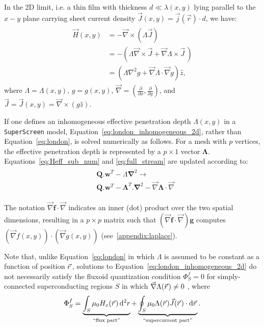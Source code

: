 \documentclass[final,3p,times,twocolumn]{elsarticle}
\newcommand{\pvec}[1]{\vec{#1}\mkern2mu\vphantom{#1}}
\newcommand{\inline}[1]{\texttt{#1}\xspace}
\newcommand{\SuperScreen}{\inline{SuperScreen}}
\newcounter{bla}
\begin{document}
In the 2D limit, i.e. a thin film with thickness $d\ll\lambda(x, y)$ lying parallel to the $x-y$ plane carrying sheet current density $\vec{J}(x, y)=\vec{j}(\vec{r})\cdot d$, we have:
\begin{align}
\begin{split}
    \label{eq:london_inhomogeneous_2d}
    \vec{H}(x, y)&=-\vec{\nabla}\times(\Lambda\vec{J})\\
    &=-\left(\Lambda\vec{\nabla}\times\vec{J}+\vec{\nabla}\Lambda\times\vec{J}\,\right)\\
    &=\left(\Lambda\nabla^2g+\vec{\nabla}\Lambda\cdot\vec{\nabla}g\right)\hat{z},
\end{split}
\end{align}
where $\Lambda=\Lambda(x, y)$, $g=g(x, y)$, $\vec{\nabla}=\left(\frac{\partial}{\partial x},\frac{\partial}{\partial y}\right)$, and $\vec{J}=\vec{J}(x, y)=\vec{\nabla}\times(g\hat{z})$.

If one defines an inhomogeneous effective penetration depth $\Lambda(x, y)$ in a \SuperScreen model, Equation~\ref{eq:london_inhomogeneous_2d}, rather than Equation~\ref{eq:london}, is solved numerically as follows. For a mesh with $p$ vertices, the effective penetration depth is represented by a $p\times 1$ vector $\mathbf{\Lambda}$. Equations~\ref{eq:Heff_sub_num} and \ref{eq:full_stream} are updated according to:
\begin{align}
\begin{split}
    \label{eq:Heff_inhomogeneous}
    &\mathbf{Q}.\mathbf{w}^T-\Lambda\mathbf{\nabla}^2\to\\
    &\mathbf{Q}.\mathbf{w}^T-\mathbf{\Lambda}^T.\mathbf{\nabla}^2-\vec{\nabla}\mathbf{\Lambda}\cdot\vec{\nabla}
\end{split}
\end{align}

The notation $\vec{\nabla}\mathbf{f}\cdot\vec{\nabla}$ indicates an inner (dot) product over the two spatial dimensions, resulting in a $p\times p$ matrix such that $(\vec{\nabla}\mathbf{f}\cdot\vec{\nabla})\mathbf{g}$ computes $(\vec{\nabla}f(x, y))\cdot(\vec{\nabla}g(x, y))$ (see~\ref{appendix:laplace}).

Note that, unlike Equation~\ref{eq:london} in which $\Lambda$ is assumed to be constant as a function of position $\pvec{r}$, solutions to Equation~\ref{eq:london_inhomogeneous_2d} do not necessarily satisfy the fluxoid quantization condition $\Phi^f_S=0$ for simply-connected superconducting regions $S$ in which $\vec{\nabla}\Lambda(\pvec{r})\neq0$ , where
\begin{equation}
	\Phi^f_S=\underbrace{\int_S\mu_0H_z(\pvec{r})\,\mathrm{d}^2r}_{\text{``flux part''}} + \underbrace{\oint_S\mu_0\Lambda(\pvec{r})\vec{J}(\pvec{r})\cdot\mathrm{d}\pvec{r}}_{\text{``supercurrent part''}}.
\end{equation}
 
\end{document}
